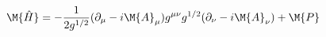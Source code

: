 \begin{equation}
\M{\hat{H}} = -\frac{1}{2g^{1/2}}(\mathbf{\partial}_{\mu} - i\M{A}_{\mu})g^{\mu\nu}g^{1/2}(\mathbf{\partial}_{\nu} - i\M{A}_{\nu}) + \M{P}
\label{2.21}
\end{equation}

